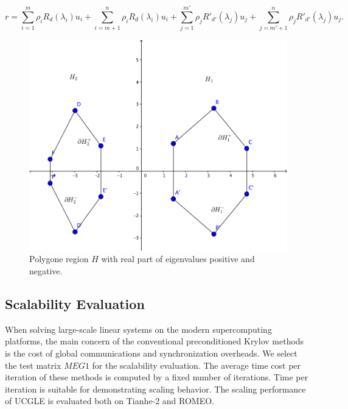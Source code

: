 \begin{enumerate}[label=(\arabic*)]
	\[
	r = \sum_{i=1}^{m}\rho_i R_d(\lambda_i)u_i + \sum_{i=m+1}^{n}\rho_i R_d(\lambda_i)u_i+\sum_{j=1}^{m'}\rho_j R'_{d'}(\lambda_j)u_j + \sum_{j=m'+1}^{n}\rho_j R'_{d'}(\lambda_j)u_j.
	\]
	
\end{enumerate}

\begin{figure}[htbp]
	\centering
	\includegraphics[width=0.8\linewidth]{fig/real-imaginary.png}
	\caption{Polygone region $H$ with real part of eigenvalues positive and negative.}
	\label{fig:imag-complex}
\end{figure}

\subsection{Scalability Evaluation}

When solving large-scale linear systems on the modern supercomputing platforms, the main concern of the conventional preconditioned Krylov methods is the cost of global communications and synchronization overheads. We select the test matrix $MEG1$ for the scalability evaluation. The average time cost per iteration of these methods is computed by a fixed number of iterations. Time per iteration is suitable for demonstrating scaling behavior. The scaling performance of UCGLE is evaluated both on Tianhe-2 and ROMEO.

